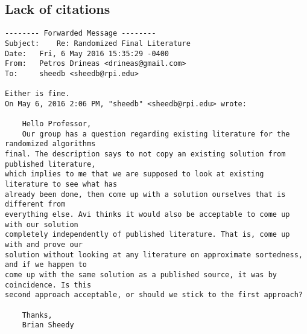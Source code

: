 \documentclass{article}
\begin{document}
\subsection{Lack of citations}
\begin{verbatim}
-------- Forwarded Message --------
Subject:    Re: Randomized Final Literature
Date:   Fri, 6 May 2016 15:35:29 -0400
From:   Petros Drineas <drineas@gmail.com>
To:     sheedb <sheedb@rpi.edu>

Either is fine.
On May 6, 2016 2:06 PM, "sheedb" <sheedb@rpi.edu> wrote:

    Hello Professor,
    Our group has a question regarding existing literature for the randomized algorithms 
final. The description says to not copy an existing solution from published literature, 
which implies to me that we are supposed to look at existing literature to see what has 
already been done, then come up with a solution ourselves that is different from 
everything else. Avi thinks it would also be acceptable to come up with our solution 
completely independently of published literature. That is, come up with and prove our 
solution without looking at any literature on approximate sortedness, and if we happen to 
come up with the same solution as a published source, it was by coincidence. Is this 
second approach acceptable, or should we stick to the first approach?

    Thanks,
    Brian Sheedy
\end{verbatim}
\end{document}
